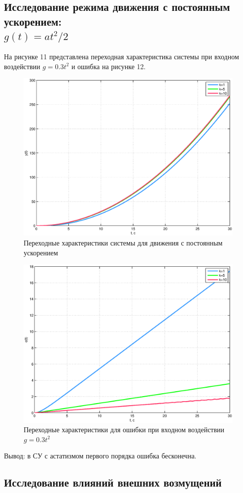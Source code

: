 \documentclass[12pt,a4paper]{article}
\begin{document}
\subsection{Исследование режима движения с постоянным ускорением: \\$g(t)=at^2/2$} 
На рисунке 11 представлена переходная характеристика системы при входном воздействии $g=0.3t^2$ и ошибка на рисунке 12.
\begin{figure}[H]
	\centering
	\includegraphics[width=0.8\linewidth]{scheme/plot9.eps}
	\caption{Переходные характеристики системы для движения с постоянным ускорением}
\end{figure}
\begin{figure}[H]
	\centering
	\includegraphics[width=0.8\linewidth]{scheme/plot10.eps}
	\caption{Переходные характеристики для ошибки при входном воздействии $g=0.3t^2$}
\end{figure}
\par Вывод: в СУ с астатизмом первого порядка ошибка бесконечна.
\newpage
\begin{center}
\section{Исследование влияний внешних возмущений}
\end{center}\par
\end{document}
